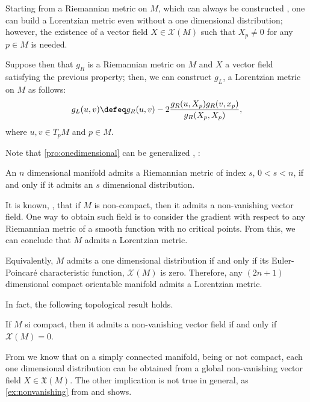 Starting from a Riemannian metric on $M$, which can always be constructed \cite{romero10}, one can build a Lorentzian metric even without a one dimensional distribution; however, the existence of a vector field $X \in \mathcal{X}(M)$ such that $X_p \neq 0$ for any $p \in M$ is needed.

Suppose then that $g_R$ is a Riemannian metric on $M$ and $X$ a vector field satisfying the previous property; then, we can construct $g_L$, a Lorentzian metric on $M$ as follows:
\[
	g_L(u,v) \defeq g_R(u,v) - 2  \frac{g_R(u, X_p)g_R(v,x_p)}{g_R(X_p,X_p)},
\]
where $u,v \in T_pM$ and $p \in M$.

Note that \autoref{pro:onedimensional} can be generalized \cite[Prop. 4.3]{romero10}, \cite{greub72}:

\begin{proposition}
	An $n$ dimensional manifold admits a Riemannian metric of index $s$, $0 < s < n$, if and only if it admits an $s$ dimensional distribution.
\end{proposition}

It is known, \cite[p. 205]{romero10}, that if $M$ is non-compact, then it admits a non-vanishing vector field. One way to obtain such field is to consider the gradient with respect to any Riemannian metric of a smooth function with no critical points. From this, we can conclude that $M$ admits a Lorentzian metric.

Equivalently, $M$ admits a one dimensional distribution if and only if its Euler-Poincaré characteristic function, $\mathcal{X}(M)$ is zero. Therefore, any $(2n + 1)$ dimensional compact orientable manifold admits a Lorentzian metric.

In fact, the following topological result holds.
\begin{proposition}
	If $M$ si compact, then it admits a non-vanishing vector field if and only if $\mathcal{X}(M)=0$.
\end{proposition}

From \cite{romero10} we know that on a simply connected manifold, being or not compact, each one dimensional distribution can be obtained from a global non-vanishing vector field $X \in \mathfrak{X}(M)$. The other implication is not true in general, as \autoref{ex:nonvanishing} from \cite[pp. 205-206]{romero10} and \cite{greub72} shows.

